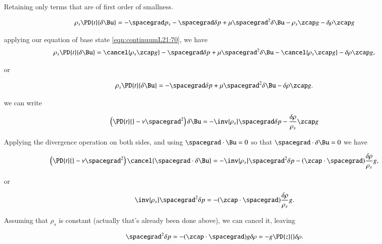 Retaining only terms that are of first order of smallness.

\begin{equation}\label{eqn:continuumL21:110}
\rho_s \PD{t}{\delta \Bu} = - \spacegrad p_s - \spacegrad \delta p + \mu \spacegrad^2 \delta \Bu - \rho_s \zcap g - \delta \rho \zcap g
\end{equation}

applying our equation of base state \ref{eqn:continuumL21:70}, we have
\begin{equation}\label{eqn:continuumL21:110b}
\rho_s \PD{t}{\delta \Bu} = \cancel{\rho_s \zcap g} - \spacegrad \delta p + \mu \spacegrad^2 \delta \Bu - \cancel{\rho_s \zcap g} - \delta \rho \zcap g,
\end{equation}

or

\begin{equation}\label{eqn:continuumL21:110c}
\rho_s \PD{t}{\delta \Bu} = - \spacegrad \delta p + \mu \spacegrad^2 \delta \Bu - \delta \rho \zcap g.
\end{equation}

we can write

\begin{equation}\label{eqn:continuumL21:130}
\left( \PD{t}{} - \nu \spacegrad^2 \right) \delta \Bu = -\inv{\rho_s} \spacegrad \delta p - \frac{\delta \rho}{\rho_s} \zcap g
\end{equation}

Applying the divergence operation on both sides, and using $\spacegrad \cdot \Bu = 0$ so that $\spacegrad \cdot \delta \Bu = 0$ we have

\begin{equation}\label{eqn:continuumL21:150}
\left( \PD{t}{} - \nu \spacegrad^2 \right) \cancel{\spacegrad \cdot \delta \Bu} = -\inv{\rho_s} \spacegrad^2 \delta p - (\zcap \cdot \spacegrad ) \frac{\delta \rho}{\rho_s} g,
\end{equation}

or

\begin{equation}\label{eqn:continuumL21:170}
\inv{\rho_s} \spacegrad^2 \delta p = - (\zcap \cdot \spacegrad ) \frac{\delta \rho}{\rho_s} g.
\end{equation}

Assuming that $\rho_s$ is constant (actually that's already been done above), we can cancel it, leaving

\begin{equation}\label{eqn:continuumL21:190}
\spacegrad^2 \delta p = - (\zcap \cdot \spacegrad ) g \delta \rho = -g \PD{z}{} \delta \rho.
\end{equation}

